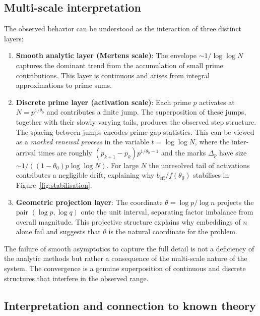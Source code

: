 \documentclass[11pt]{article}
\theoremstyle{definition}
\begin{document}
\subsection{Multi-scale interpretation}

The observed behavior can be understood as the interaction of three distinct layers:

\begin{enumerate}[label=(\arabic*), leftmargin=*]
  \item \textbf{Smooth analytic layer (Mertens scale)}: The envelope
        \(\sim 1/\log\log N\) captures the dominant trend from the accumulation of
        small prime contributions.  This layer is continuous and arises from
        integral approximations to prime sums.

  \item \textbf{Discrete prime layer (activation scale)}: Each prime \(p\) activates at
        \(N = p^{1/\theta_0}\) and contributes a finite jump.  The superposition of
        these jumps, together with their slowly varying tails, produces the observed
        step structure.  The spacing between jumps encodes prime gap statistics.
        This can be viewed as a \emph{marked renewal process} in the variable
        \(t = \log\log N\), where the inter-arrival times are roughly
        \((p_{k+1}-p_k)p^{1/\theta_0-1}\) and the marks \(\Delta_p\) have size
        \(\sim 1/((1-\theta_0)p\log\log N)\).  For large \(N\) the unresolved tail
        of activations contributes a negligible drift, explaining why
        \(b_{\mathrm{eff}}/f(\theta_0)\) stabilises in Figure~\ref{fig:stabilisation}.

  \item \textbf{Geometric projection layer}: The coordinate
        \(\theta = \log p / \log n\) projects the pair \((\log p, \log q)\) onto the
        unit interval, separating factor imbalance from overall magnitude.  This
        projective structure explains why embeddings of \(n\) alone fail and suggests
        that \(\theta\) is the natural coordinate for the problem.
\end{enumerate}

The failure of smooth asymptotics to capture the full detail is not a deficiency
of the analytic methods but rather a consequence of the multi-scale nature of the
system.  The convergence is a genuine superposition of continuous and discrete
structures that interfere in the observed range.

\subsection{Interpretation and connection to known theory}
\end{document}
